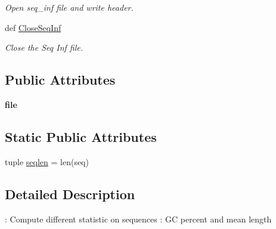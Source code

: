 \begin{DoxyCompactItemize}
\begin{DoxyCompactList}\small\item\em \-Open seq\-\_\-inf file and write header. \end{DoxyCompactList}\item 
\hypertarget{classiRNA__pred_1_1Stat_1_1Stat_a38496ae60fd0afe303c397ccc3d535eb}{
def \hyperlink{classiRNA__pred_1_1Stat_1_1Stat_a38496ae60fd0afe303c397ccc3d535eb}{\-Close\-Seq\-Inf}}
\label{classiRNA__pred_1_1Stat_1_1Stat_a38496ae60fd0afe303c397ccc3d535eb}

\begin{DoxyCompactList}\small\item\em \-Close the \-Seq \-Inf file. \end{DoxyCompactList}\end{DoxyCompactItemize}
\subsection*{\-Public \-Attributes}
\begin{DoxyCompactItemize}
\item 
\hypertarget{classiRNA__pred_1_1Stat_1_1Stat_a00b3f83e42d1b156efd9fa1e5f0073bc}{
{\bfseries file}}
\label{classiRNA__pred_1_1Stat_1_1Stat_a00b3f83e42d1b156efd9fa1e5f0073bc}

\end{DoxyCompactItemize}
\subsection*{\-Static \-Public \-Attributes}
\begin{DoxyCompactItemize}
\item 
tuple \hyperlink{classiRNA__pred_1_1Stat_1_1Stat_a3a7dafa5e97f208ef4f625abec21d8d5}{seqlen} = len(seq)
\end{DoxyCompactItemize}


\subsection{\-Detailed \-Description}
\-: \-Compute different statistic on sequences \-: \-G\-C percent and mean length 

